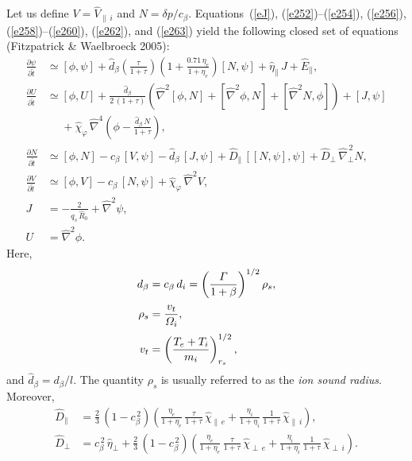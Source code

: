 \documentclass[notitlepage,12pt]{article}
\begin{document}
Let us define $V=\hat{V}_{\parallel\,i}$ and $N=\delta p/c_\beta$. Equations~(\ref{eJ}), (\ref{e252})--(\ref{e254}), (\ref{e256}), (\ref{e258})--(\ref{e260}), (\ref{e262}), and (\ref{e263}) yield the following closed set of equations (Fitzpatrick \& Waelbroeck 2005):
\begin{align}\label{e264}
\frac{\partial\psi}{\partial\hat{t}}&\simeq [\phi,\psi] + \hat{d}_\beta\!\left(\frac{\tau}{1+\tau}\right)\left(1+\frac{0.71\,\eta_e}{1+\eta_e}\right)[N,\psi]
+\hat{\eta}_\parallel\,J + \hat{E}_\parallel,\\[0.5ex]
\frac{\partial U}{\partial \hat{t}}&\simeq [\phi,U] + \frac{\hat{d}_\beta}{2\,(1+\tau)}\left(\hat{\nabla}^2[\phi,N] + [\hat{\nabla}^2\phi,N] + [\hat{\nabla}^2 N,\phi]\right) + [J,\psi] \nonumber\\[0.5ex]&\phantom{=}+\hat{\chi}_\varphi  \,\hat{\nabla}^4\!\left(\phi - \frac{\hat{d}_\beta\,N}{1+\tau}\right),\label{e265} \\[0.5ex]
\frac{\partial N}{\partial \hat{t}}&\simeq [\phi,N] -c_\beta\,[V,\psi] -\hat{d}_\beta\,[J,\psi] + \hat{D}_\parallel\,[[N,\psi],\psi]
+ \hat{D}_\perp\,\hat{\nabla}_\perp^{\,2}N,\label{e266}\\[0.5ex]
\frac{\partial V}{\partial\hat{t}}&\simeq [\phi,V] - c_\beta\,[N,\psi] + \hat{\chi}_\varphi\,\hat{\nabla}^2 V,\label{e267}\\[0.5ex]
J &=-\frac{2}{q_s\,\hat{R}_0}+\hat{\nabla}^2\psi,\\[0.5ex]
U &=\hat{\nabla}^2 \phi.\label{e269}
\end{align}
Here, 
\begin{align}\label{e270}
d_\beta &= c_\beta\,d_i = \left(\frac{{\mit\Gamma}}{1+\beta}\right)^{1/2}\rho_s,\\[0.5ex]
 \rho_s &= \frac{v_t}{{\mit\Omega}_i},\\[0.5ex]
v_t &= \left(\frac{T_e+T_i}{m_i}\right)^{1/2}_{r_s},
\end{align}
and $\hat{d}_\beta=d_\beta/l$. The quantity $\rho_s$ is usually referred to as the {\em ion sound radius}. 
Moreover,
\begin{align}
\hat{D}_\parallel&= \frac{2}{3}\,(1-c_\beta^{\,2})\!\left(\frac{\eta_e}{1+\eta_e}\,\frac{\tau}{1+\tau}\,\hat{\chi}_{\parallel\,e} + \frac{\eta_i}{1+\eta_i}\,\frac{1}{1+\tau}\,\hat{\chi}_{\parallel\,i}\right),\\[0.5ex]
\hat{D}_\perp &= c_\beta^{\,2}\,\hat{\eta}_\perp +  \frac{2}{3}\,(1-c_\beta^{\,2})\!\left(\frac{\eta_e}{1+\eta_e}\,\frac{\tau}{1+\tau}\,\hat{\chi}_{\perp\,e} + \frac{\eta_i}{1+\eta_i}\,\frac{1}{1+\tau}\,\hat{\chi}_{\perp\,i}\right).
\end{align}
\end{document}
